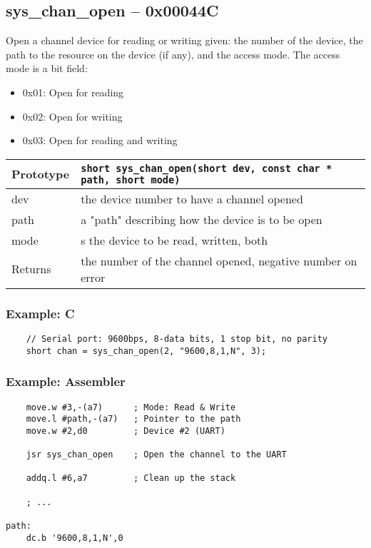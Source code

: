 \subsection*{sys\_chan\_open -- 0x00044C}
Open a channel device for reading or writing given: the number of the device, the path to the resource on the device (if any), and the access mode.
The access mode is a bit field:
\begin{itemize}
    \item 0x01: Open for reading
    \item 0x02: Open for writing
    \item 0x03: Open for reading and writing
\end{itemize}

\bigskip

\begin{tabular}{|l||l|} \hline
Prototype & \lstinline!short sys_chan_open(short dev, const char * path, short mode)! \\ \hline
dev & the device number to have a channel opened \\ \hline
path & a "path" describing how the device is to be open \\ \hline
mode & s the device to be read, written, both\\ \hline
Returns & the number of the channel opened, negative number on error \\ \hline
\end{tabular}

\subsubsection*{Example: C}
\begin{lstlisting}
    // Serial port: 9600bps, 8-data bits, 1 stop bit, no parity
    short chan = sys_chan_open(2, "9600,8,1,N", 3);    
\end{lstlisting}

\subsubsection*{Example: Assembler}
\begin{verbatim}
    move.w #3,-(a7)      ; Mode: Read & Write
    move.l #path,-(a7)   ; Pointer to the path
    move.w #2,d0         ; Device #2 (UART)
    
    jsr sys_chan_open    ; Open the channel to the UART

    addq.l #6,a7         ; Clean up the stack

    ; ...

path:
    dc.b '9600,8,1,N',0
\end{verbatim}


